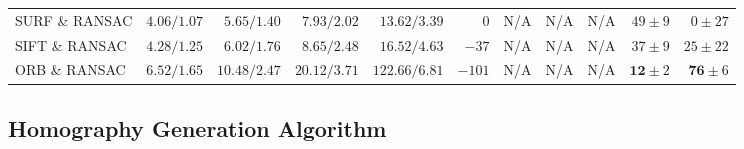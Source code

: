\begin{table}
\begin{adjustbox}{angle=90, max height=0.9\textheight}
\begin{tabular}{lrrrrrrrrrr}
        SURF \& RANSAC  & $4.06/1.07         $ & $ 5.65/1.40         $ & $ 7.93/2.02         $ & $ 13.62/3.39                  $ & $   0         $ & N/A     & N/A     &  N/A                & $49          \pm 9$ & $   0          \pm 27$ \\
        SIFT \& RANSAC  & $4.28/1.25         $ & $ 6.02/1.76         $ & $ 8.65/2.48         $ & $ 16.52/4.63                  $ & $- 37         $ & N/A     & N/A     &  N/A                & $37          \pm 9$ & $  25          \pm 22$ \\
        ORB \& RANSAC   & $6.52/1.65         $ & $10.48/2.47         $ & $20.12/3.71         $ & $122.66/6.81                  $ & $-101         $ & N/A     & N/A     &  N/A                & $\mathbf{12} \pm 2$ & $  \mathbf{76} \pm  6$ \\ \bottomrule
    \end{tabular}
\end{adjustbox}
\end{table}
\subsection{Homography Generation Algorithm}
\label{c3:sec:hom_opt}


